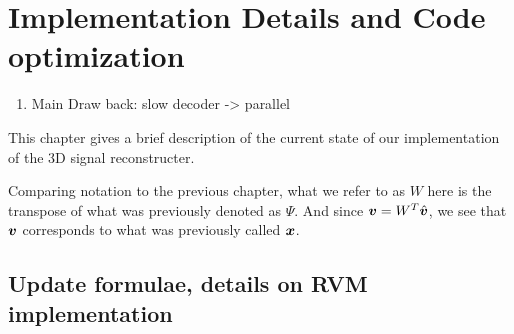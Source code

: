 \chapter{Implementation Details and Code optimization}
\label{ch:code}
\begin{enumerate}
\item Main Draw back: slow decoder -> parallel
\end{enumerate}

This chapter gives a brief description of the current state of our implementation of the 3D signal reconstructer.

Comparing notation to the previous chapter, what we refer to as $W$ here is the transpose of what was previously denoted as $\Psi$.
And since $\boldsymbol v = W^T \hat{\boldsymbol v}$, we see that $\boldsymbol v$ corresponds to what was previously called $\boldsymbol x$. 

\section{Update formulae, details on RVM implementation}
